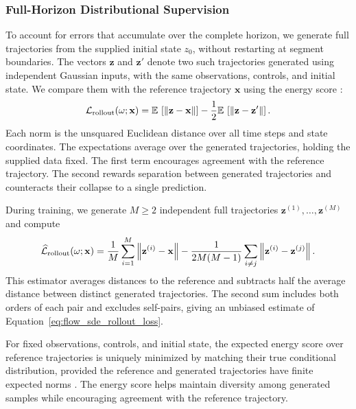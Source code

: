 \subsubsection{Full-Horizon Distributional Supervision}\label{sec:training-rollout}
To account for errors that accumulate over the complete horizon, we generate full trajectories from the supplied initial state $z_0$, without restarting at segment boundaries. The vectors $\mathbf z$ and $\mathbf z'$ denote two such trajectories generated using independent Gaussian inputs, with the same observations, controls, and initial state. We compare them with the reference trajectory $\mathbf x$ using the energy score \citep{gneiting2007proper}:
\begin{equation}\label{eq:flow_sde_rollout_loss}
 \mathcal L_{\mathrm{rollout}}(\omega;\mathbf x)
 =\mathbb E\,\left[\left\lVert \mathbf z-\mathbf x\right\rVert\right]
 -\frac12\mathbb E\,\left[\left\lVert \mathbf z-\mathbf z'\right\rVert\right].
\end{equation}
Each norm is the unsquared Euclidean distance over all time steps and state coordinates. The expectations average over the generated trajectories, holding the supplied data fixed. The first term encourages agreement with the reference trajectory. The second rewards separation between generated trajectories and counteracts their collapse to a single prediction.

During training, we generate $M\geq2$ independent full trajectories $\mathbf z^{(1)},\ldots,\mathbf z^{(M)}$ and compute
\begin{equation}\label{eq:energy-score-estimator}
 \widehat{\mathcal L}_{\mathrm{rollout}}(\omega;\mathbf x)
 =\frac1M\sum_{i=1}^M\left\lVert \mathbf z^{(i)}-\mathbf x\right\rVert
 -\frac{1}{2M(M-1)}\sum_{i\ne j}\left\lVert \mathbf z^{(i)}-\mathbf z^{(j)}\right\rVert.
\end{equation}
This estimator averages distances to the reference and subtracts half the average distance between distinct generated trajectories. The second sum includes both orders of each pair and excludes self-pairs, giving an unbiased estimate of Equation~\eqref{eq:flow_sde_rollout_loss}.

For fixed observations, controls, and initial state, the expected energy score over reference trajectories is uniquely minimized by matching their true conditional distribution, provided the reference and generated trajectories have finite expected norms \citep{gneiting2007proper,szekely2013energy}. The energy score helps maintain diversity among generated samples while encouraging agreement with the reference trajectory.

